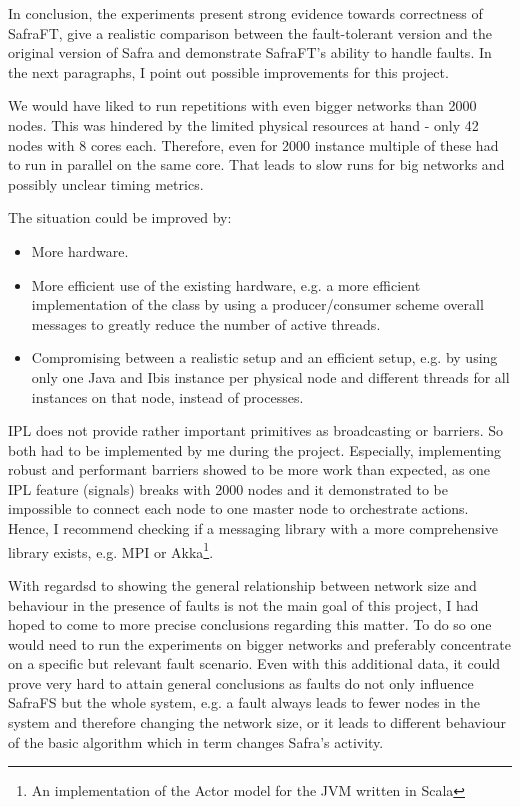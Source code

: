 In conclusion, the experiments present strong evidence towards correctness of SafraFT, give a realistic comparison between the fault-tolerant version and the original version of Safra and demonstrate SafraFT's ability to handle faults.
In the next paragraphs, I point out possible improvements for this project.

We would have liked to run repetitions with even bigger networks than 2000 nodes.
This was hindered by the limited physical resources at hand - only 42 nodes with 8 cores each.
Therefore, even for 2000 instance multiple of these had to run in parallel on the same core.
That leads to slow runs for big networks and possibly unclear timing metrics.

The situation could be improved by:
\begin{itemize}
    \item More hardware.
    \item More efficient use of the existing hardware, e.g. a more efficient implementation of the  class by using a producer/consumer scheme overall messages to greatly reduce the number of active threads.
    \item Compromising between a realistic setup and an efficient setup, e.g. by using only one Java and Ibis instance per physical node and different threads for all instances on that node, instead of processes.
\end{itemize}


IPL does not provide rather important primitives as broadcasting or barriers.
So both had to be implemented by me during the project.
Especially, implementing robust and performant barriers showed to be more work than expected, as one IPL feature (signals) breaks with 2000 nodes and it demonstrated to be impossible to connect each node to one master node to orchestrate actions.
Hence, I recommend checking if a messaging library with a more comprehensive library exists, e.g. MPI or Akka\footnote{An implementation of the Actor model for the JVM written in Scala}.

With regardsd to showing the general relationship between network size and behaviour in the presence of faults is not the main goal of this project, I had hoped to come to more precise conclusions regarding this matter.
To do so one would need to run the experiments on bigger networks and preferably concentrate on a specific but relevant fault scenario.
Even with this additional data, it could prove very hard to attain general conclusions as faults do not only influence SafraFS but the whole system, e.g. a fault always leads to fewer nodes in the system and therefore changing the network size, or it leads to different behaviour of the basic algorithm which in term changes Safra's activity.

